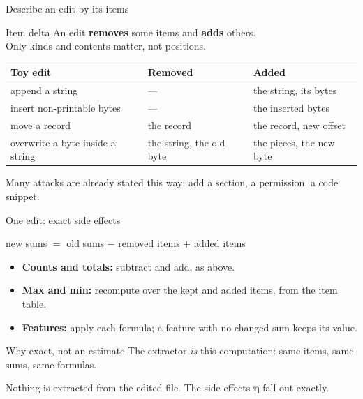 \documentclass[aspectratio=169,11pt]{beamer}
\begin{document}
\begin{frame}{Describe an edit by its items}
  \begin{block}{Item delta}
    An edit \textbf{removes} some items and \textbf{adds} others.\\
    Only kinds and contents matter, not positions.
  \end{block}
  \vfill
  \renewcommand{\arraystretch}{1.35}
  \begin{center}
    \small
    \begin{tabular}{@{}lll@{}}
      \toprule
      \textbf{Toy edit} & \textbf{Removed} & \textbf{Added} \\
      \midrule
      append a string & --- & the string, its bytes \\
      insert non-printable bytes & --- & the inserted bytes \\
      move a record & the record & the record, new offset \\
      overwrite a byte inside a string & the string, the old byte & the pieces, the new byte \\
      \bottomrule
    \end{tabular}
  \end{center}
  \vfill
  \begin{center}
    Many attacks are already stated this way: add a section, a permission, a code snippet.
  \end{center}
\end{frame}

\begin{frame}{One edit: exact side effects}
  \begin{center}
    \large new sums $=$ old sums $-$ removed items $+$ added items
  \end{center}
  \vfill
  \begin{itemize}
    \item \textbf{Counts and totals:} subtract and add, as above.
    \item \textbf{Max and min:} recompute over the kept and added items, from the item table.
    \item \textbf{Features:} apply each formula; a feature with no changed sum keeps its value.
  \end{itemize}
  \vfill
  \begin{exampleblock}{Why exact, not an estimate}
    The extractor \emph{is} this computation: same items, same sums, same formulas.
  \end{exampleblock}
  \vfill
  \begin{center}
    Nothing is extracted from the edited file. The side effects $\boldsymbol{\eta}$ fall out exactly.
  \end{center}
\end{frame}
\end{document}
